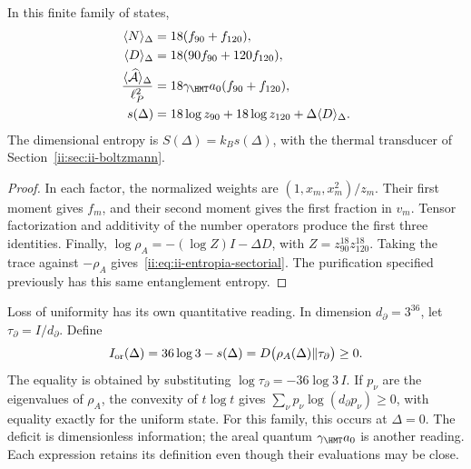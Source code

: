 \begin{proposition}
In this finite family of states,
\begin{align}
 \langle N\rangle_\Delta&=18(f_{90}+f_{120}),\\
 \langle D\rangle_\Delta&=18(90f_{90}+120f_{120}),\\
 \frac{\langle\widehat{\mathcal A}\rangle_\Delta}{\ell_P^2}
 &=18\gamma_{\HMT}a_0(f_{90}+f_{120}),
 \label{ii:eq:ii-area-media}\\
 s(\Delta)&=18\log z_{90}+18\log z_{120}
                  +\Delta\langle D\rangle_\Delta.
 \label{ii:eq:ii-entropia-sectorial}
\end{align}
The dimensional entropy is $S(\Delta)=k_Bs(\Delta)$, with the
thermal transducer of Section~\ref{ii:sec:ii-boltzmann}.
\end{proposition}
\begin{proof}
In each factor, the normalized weights are
$(1,x_m,x_m^2)/z_m$. Their first moment gives $f_m$, and their second
moment gives the first fraction in $v_m$. Tensor factorization
and additivity of the number operators produce the first three
identities. Finally,
$\log\rho_A=-(\log Z)I-\Delta D$, with
$Z=z_{90}^{18}z_{120}^{18}$. Taking the trace against $-\rho_A$
gives~\eqref{ii:eq:ii-entropia-sectorial}. The purification specified
previously has this same entanglement entropy.
\end{proof}

Loss of uniformity has its own quantitative reading.
In dimension \(d_\partial=3^{36}\), let
\(\tau_\partial=I/d_\partial\). Define
\begin{equation}
 I_{\rm or}(\Delta)=36\log3-s(\Delta)
 =D\bigl(\rho_A(\Delta)\Vert\tau_\partial\bigr)\ge0.
 \label{ii:eq:ii-area-deficit-informacional}
\end{equation}
The equality is obtained by substituting
\(\log\tau_\partial=-36\log3\,I\). If \(p_\nu\) are the
eigenvalues of \(\rho_A\), the convexity of \(t\log t\) gives
\(\sum_\nu p_\nu\log(d_\partial p_\nu)\ge0\), with equality
exactly for the uniform state. For this family, this occurs at
\(\Delta=0\). The deficit is dimensionless information; the areal
quantum \(\gamma_{\HMT}a_0\) is another reading. Each expression retains
its definition even though their evaluations may be close.

